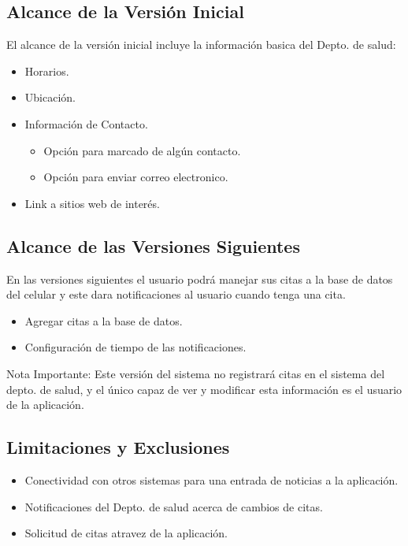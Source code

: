 \documentclass[12pt]{article}
\begin{document}
\subsection{Alcance de la Versi\'on Inicial}

El alcance de la versi\'on inicial incluye la informaci\'on basica del Depto. de salud:
\begin{itemize}
	\item{Horarios.}
	\item{Ubicaci\'on.}
	\item{Informaci\'on de Contacto.}
	\begin{itemize}
		\item{Opci\'on para marcado de alg\'un contacto.}
		\item{Opci\'on para enviar correo electronico.}
	\end{itemize}
	\item{Link a sitios web de inter\'es.}
\end{itemize}

\subsection{Alcance de las Versiones Siguientes}

En las versiones siguientes el usuario podr\'a manejar sus citas a la base de datos del celular y este dara notificaciones al usuario cuando tenga una cita.

\begin{itemize}
	\item{Agregar citas a la base de datos.}
	\item{Configuraci\'on de tiempo de las notificaciones.}
\end{itemize}
\begin{footnotesize} Nota Importante: Este versi\'on del sistema no registrar\'a citas en el sistema del depto. de salud, y el \'unico capaz de ver y modificar esta informaci\'on es el usuario de la aplicaci\'on. \end{footnotesize}


\subsection{Limitaciones y Exclusiones}

\begin{itemize}
	\item{Conectividad con otros sistemas para una entrada de noticias a la aplicaci\'on.}
	\item{Notificaciones del Depto. de salud acerca de cambios de citas.}
	\item{Solicitud de citas atravez de la aplicaci\'on.}
\end{itemize}
\end{document}
